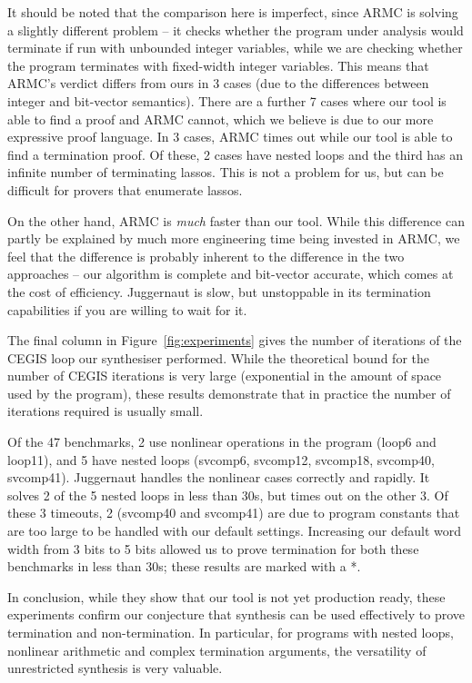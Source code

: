 \documentclass[preprint]{sigplanconf}
\theoremstyle{definition}
\begin{document}
It should be noted that the comparison here is imperfect, since {\sc ARMC}
is solving a slightly different problem -- it checks whether the program
under analysis would terminate if run with unbounded integer variables,
while we are checking whether the program terminates with fixed-width
integer variables.  This means that {\sc ARMC}'s verdict differs from ours
in 3 cases (due to the differences between integer and bit-vector
semantics).  There are a further 7 cases where our tool is able to find a
proof and {\sc ARMC} cannot, which we believe is due to our more expressive
proof language.  In 3 cases, {\sc ARMC} times out while our tool is able to
find a termination proof.  Of these, 2 cases have nested loops and the
third has an infinite number of terminating lassos.  This is not a problem for us,
but can be difficult for provers that enumerate lassos.

On the other hand, {\sc ARMC} is \emph{much} faster than our tool.  While
this difference can partly be explained by much more engineering time being
invested in {\sc ARMC}, we feel that the difference is probably inherent to
the difference in the two approaches -- our algorithm is complete and
bit-vector accurate, which comes at the cost of efficiency.
{\sc Juggernaut} is slow, but unstoppable in its
termination capabilities if you are willing to wait for it.

The final column in Figure~\ref{fig:experiments} gives the number of
iterations of the CEGIS loop our synthesiser performed.  While the
theoretical bound for the number of CEGIS iterations is very large
(exponential in the amount of space used by the program), these results
demonstrate that in practice the number of iterations required is usually
small.

Of the 47 benchmarks, 2 use nonlinear operations in the program (loop6 and loop11),
and 5 have nested loops (svcomp6, svcomp12, svcomp18, svcomp40, svcomp41).
{\sc Juggernaut} handles the nonlinear cases correctly and rapidly.
It solves 2 of the 5 nested loops in less than 30s, but times out on the other
3.  Of these 3 timeouts, 2 (svcomp40 and svcomp41) are due to program constants that
are too large to be handled with our default settings.  Increasing
our default word width from 3 bits to 5 bits allowed us to prove termination
for both these benchmarks in less than 30s; these results are marked with a *.

In conclusion, while they show that our tool is not yet production ready,
these experiments confirm our conjecture that synthesis can be used
effectively to prove termination and non-termination.  In particular,
for programs with nested loops, nonlinear arithmetic and complex
termination arguments, the versatility of unrestricted synthesis
is very valuable.
\end{document}
